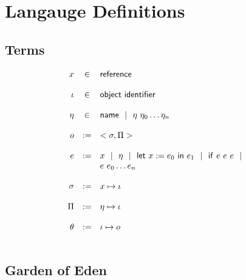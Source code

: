 \documentclass[9pt]{article}
\begin{document}
\section{Langauge Definitions}

\subsection{Terms}

\[
	\begin{array}{rcl}
	x &\in& \mathsf{reference}\\
	\\
	\iota &\in& \mathsf{object~identifier}\\
	\\
	\eta &\in& \mathsf{name} ~~|~~ \eta~\eta_0 \ldots \eta_n\\
	\\
	o &:=& <\sigma, \Pi>\\
	\\
	e &:=& x ~~|~~ \eta ~~|~~ \mathsf{let}~x:=e_0~\mathsf{in}~e_1 ~~|~~ \mathsf{if}~e~e~e ~~|~~\\
	       && e~e_0 \ldots e_n\\
	\\
	\sigma &:=& x \mapsto \iota\\
	\\
	\Pi &:=& \eta \mapsto \iota\\
	\\
	\theta &:=& \iota \mapsto o\\
	\\
	\end{array}
\]

\subsection{Garden of Eden}
\end{document}
